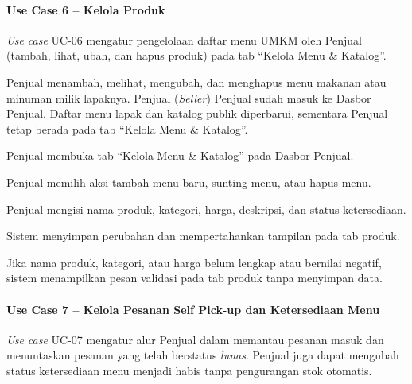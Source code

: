 \paragraph{Use Case 6 -- Kelola Produk}
\textit{Use case} UC-06 mengatur pengelolaan daftar menu UMKM oleh Penjual (tambah, lihat, ubah, dan hapus produk) pada tab ``Kelola Menu \& Katalog''.

{Penjual menambah, melihat, mengubah, dan menghapus menu makanan atau minuman milik lapaknya.}
{Penjual (\textit{Seller})}
{Penjual sudah masuk ke Dasbor Penjual.}
{Daftar menu lapak dan katalog publik diperbarui, sementara Penjual tetap berada pada tab ``Kelola Menu \& Katalog''.}
{\begin{uclist}
  \item Penjual membuka tab ``Kelola Menu \& Katalog'' pada Dasbor Penjual.
  \item Penjual memilih aksi tambah menu baru, sunting menu, atau hapus menu.
  \item Penjual mengisi nama produk, kategori, harga, deskripsi, dan status ketersediaan.
  \item Sistem menyimpan perubahan dan mempertahankan tampilan pada tab produk.
\end{uclist}}
{\begin{ucbullet}
  \item Jika nama produk, kategori, atau harga belum lengkap atau bernilai negatif, sistem menampilkan pesan validasi pada tab produk tanpa menyimpan data.
\end{ucbullet}}

\paragraph{Use Case 7 -- Kelola Pesanan Self Pick-up dan Ketersediaan Menu}
\textit{Use case} UC-07 mengatur alur Penjual dalam memantau pesanan masuk dan menuntaskan pesanan yang telah berstatus \textit{lunas}. Penjual juga dapat mengubah status ketersediaan menu menjadi habis tanpa pengurangan stok otomatis.


